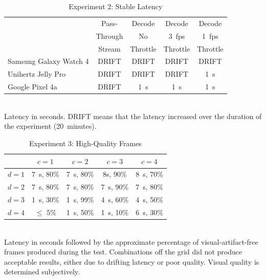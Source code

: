 \begin{table}
\centering
\begin{tabular}{|l|c|c|c|c|}
\hline
    & Pass- & Decode & Decode & Decode \\
    & Through & No & 3~fps & 1~fps \\
    & Stream & Throttle & Throttle & Throttle \\
\hline
Samsung Galaxy Watch 4 & \cellcolor{red!20}DRIFT & \cellcolor{red!20}DRIFT & \cellcolor{red!20}DRIFT & \cellcolor{red!20}DRIFT \\[0.1cm]
\hline
Unihertz Jelly Pro & \cellcolor{red!20}DRIFT & \cellcolor{red!20}DRIFT & \cellcolor{red!20}DRIFT & \cellcolor{green!20}1~s  \\[0.1cm]
\hline
Google Pixel 4a & \cellcolor{red!20}DRIFT & \cellcolor{green!20}1~s & \cellcolor{green!20}1~s & \cellcolor{green!20}1~s \\[0.1cm]
\hline
\end{tabular}
    \begin{captext}
    \\[0.1cm] \small Latency in seconds. DRIFT means that the latency increased over the duration of the experiment (20~minutes).
    \end{captext}
\caption{Experiment 2: Stable Latency}
\label{tab:stable-latency}
\end{table}

\begin{table}
\centering
\begin{tabular}{|l|c|c|c|c|}
        \hline
        & $c = 1$ & $c = 2$ & $c = 3$ & $c = 4$ \\[0.1cm]
        \hline
$d = 1$ & 7~s, 80\% & 7~s, 80\%	& 8s, 90\%	& 8~s, 70\% \\[0.1cm]
\hline
$d = 2$ & 7~s, 80\% & 7~s, 80\% & 7~s, 90\%	& 7~s, 80\% \\[0.1cm]
\hline
$d = 3$ & 1~s, 30\% & \cellcolor{green!20}1~s, 99\%	& 4~s, 60\% & 4~s, 50\% \\[0.1cm]
\hline
$d = 4$ & $\leq$ 5\% & 1~s, 50\% &	1~s, 10\% & 6~s, 30\% \\[0.1cm]
\hline
\end{tabular}
    \begin{captext}
    \\[0.1cm] \small Latency in seconds followed by the approximate percentage of visual-artifact-free frames produced during the test. Combinations off the grid did not produce acceptable results, either due to drifting latency or poor quality. Visual quality is determined subjectively.
    \end{captext}
\caption{Experiment 3: High-Quality Frames}
\label{tab:hq-frames}
\end{table}

